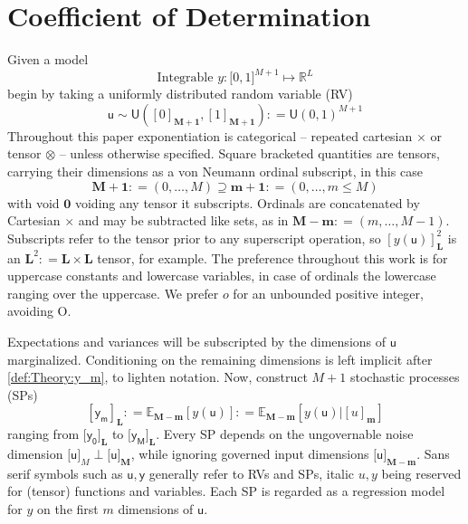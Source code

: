 \documentclass[preprint,12pt]{elsarticle}
\newcommand*{\M}[1]{\ensuremath{#1}\xspace}
\newcommand*{\x}{\times}
\newcommand*{\mi}[1]{\mathbf{#1}}
\newcommand*{\st}[1]{\mathbb{#1}}
\newcommand*{\rv}[1]{\mathsf{#1}}
\newcommand*{\te}[2][]{\left\lbrack{#2}\right\rbrack_{#1}}
\newcommand*{\tte}[2][]{\lbrack{#2}\rbrack_{#1}}
\newcommand*{\deq}{\M{\mathrel{\mathop:}=}}
\newcommand{\T}[1]{\text{#1}}
\newcommand*{\ev}[3][]{\mathbb{E}_{#3}^{#1}\!\left\lbrack{#2}\right\rbrack}
\newcommand*{\uni}[2]{\mathsf{U}\!\left({#1,#2}\right)}
\newcommand*{\uniti}{\lbrack 0,1\rbrack}
\begin{document}
\section{Coefficient of Determination}\label{sec:COD}
    Given a model
    \begin{equation*}
        \T{Integrable } y \colon \uniti^{M+1} \mapsto \st{R}^{L}
    \end{equation*}
    begin by taking a uniformly distributed random variable (RV)
    \begin{equation*}
        \rv{u} \sim \uni{\te[\mi{M+1}]{0}}{\te[\mi{M+1}]{1}} \deq \uni{0}{1}^{M+1}
    \end{equation*}
    Throughout this paper exponentiation is categorical -- repeated cartesian $\x$ or tensor $\otimes$ -- unless otherwise specified. Square bracketed quantities are tensors, carrying their dimensions as a von Neumann ordinal subscript, in this case
    \begin{equation*}
        \mi{M+1} \deq (0,\ldots,M) \supseteq \mi{m+1} \deq (0,\ldots,m \leq M)
    \end{equation*}
    with void $\mi{0}$ voiding any tensor it subscripts. Ordinals are concatenated by Cartesian $\times$ and may be subtracted like sets, as in $\mi{M-m} \deq (m,\ldots,M-1)$. 
    Subscripts refer to the tensor prior to any superscript operation, so $\te[\mi{L}]{y(\rv{u})}^{2}$ is an $\mi{L}^{2} \deq \mi{L\x L}$ tensor, for example.
    The preference throughout this work is for uppercase constants and lowercase variables, in case of ordinals the lowercase ranging over the uppercase. We prefer $o$ for an unbounded positive integer, avoiding O.

    Expectations and variances will be subscripted by the dimensions of $\rv{u}$ marginalized. Conditioning on the remaining dimensions is left implicit after \cref{def:Theory:y_m}, to lighten notation.
    Now, construct $M+1$ stochastic processes (SPs)
    \begin{equation}\label{def:Theory:y_m}
        \te[\mi{L}]{\rv{y_m}} \deq \ev{y(\rv{u})}{\mi{M-m}} \deq \ev{y(\rv{u}) \big\vert \te[\mi{m}]{u}}{\mi{M-m}}
    \end{equation}
    ranging from $\tte[\mi{L}]{\rv{y_0}}$ to $\tte[\mi{L}]{\rv{y_M}}$. Every SP depends on the ungovernable noise dimension $\tte[M]{\rv{u}} \perp \tte[\mi{M}]{\rv{u}}$, while ignoring governed input dimensions $\tte[\mi{M-m}]{\rv{u}}$. 
    Sans serif symbols such as $\rv{u,y}$ generally refer to RVs and SPs, italic $u,y$ being reserved for (tensor) functions and variables. Each SP is regarded as a regression model for $y$ on the first $m$ dimensions of $\rv{u}$.
    
\end{document}
